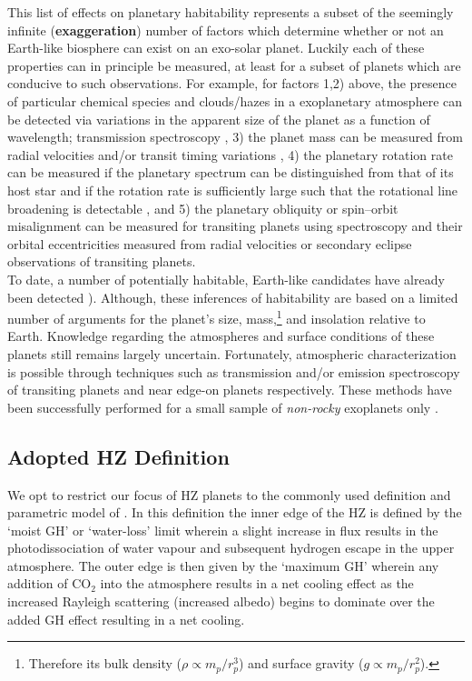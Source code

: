 This list of effects on planetary habitability represents a subset of the 
seemingly infinite (\textbf{exaggeration}) number of factors which determine 
whether or not an Earth-like biosphere can exist on an exo-solar planet. 
Luckily each of these properties can in principle be measured, at least for 
a subset of planets which are conducive to such observations. For example, 
for factors 1,2) above, 
the presence of particular chemical species and clouds/hazes 
in a exoplanetary atmosphere 
can be detected via variations in the apparent size of the planet as a function 
of wavelength; transmission spectroscopy \parencite{seager00}, 3) the planet 
mass can be measured from radial velocities and/or transit timing variations 
\parencite{holman05}, 4) the planetary rotation rate can be measured if the 
planetary spectrum can be distinguished from that of its host star and if the 
rotation rate is sufficiently large such that the rotational line broadening 
is detectable \parencite[e.g.][]{snellen14, schwarz16}, and 5) the planetary obliquity or 
spin--orbit misalignment can be measured for transiting planets using 
spectroscopy \parencite{rossiter24, mclaughlin24, queloz00} and their orbital 
eccentricities measured from radial velocities or secondary eclipse observations of 
transiting planets. \\

To date, a number of potentially habitable, Earth-like candidates have already 
been detected \parencite[e.g. Kepler-438b, 442b;][]{torres15}). Although, these 
inferences of habitability are based on a limited number of arguments for the 
planet's size, mass,\footnote{Therefore its bulk density 
($\rho \propto m_p/r_p^3$) and surface gravity ($g \propto m_p/r_p^2$).} and 
insolation relative to Earth. Knowledge regarding the atmospheres and surface 
conditions of these planets still remains largely uncertain. Fortunately, 
atmospheric 
characterization is possible through techniques such as transmission and/or 
emission spectroscopy of transiting planets and near edge-on planets 
respectively. These methods have been successfully performed for a small 
sample of \emph{non-rocky} exoplanets only 
\parencite[e.g.][]{bean13, crouzet14, kreidberg14, mccullough14}. 

\subsection{Adopted HZ Definition}
We opt to restrict our focus of HZ planets to the commonly used definition 
\parencite{kasting93} and parametric model of \cite{kopparapu13}. 
In this definition the inner edge of the HZ 
is defined by the `moist GH' or `water-loss' limit wherein a slight increase 
in flux results in the 
photodissociation of water vapour and subsequent hydrogen escape in the upper 
atmosphere. The outer edge is then given by the `maximum GH' wherein any 
addition of CO$_2$ into the atmosphere results in a net cooling effect as the 
increased Rayleigh scattering (increased albedo) begins to dominate over the 
added GH effect resulting in a net cooling. \\

